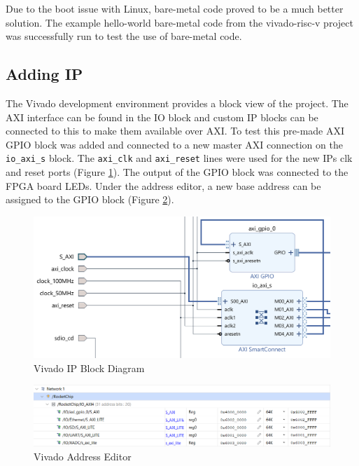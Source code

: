 Due to the boot issue with Linux, bare-metal code proved to be a much better solution. The example hello-world bare-metal code from the vivado-risc-v project was successfully run to test the use of bare-metal code.

\subsection{Adding IP}
The Vivado development environment provides a block view of the project. The AXI interface can be found in the IO block and custom IP blocks can be connected to this to make them available over AXI. To test this pre-made AXI GPIO block \cite{xilinx_gpio} was added and connected to a new master AXI connection on the \texttt{io\_axi\_s} block. The \texttt{axi\_clk} and \texttt{axi\_reset} lines were used for the new IPs clk and reset ports (Figure \ref{fig:gpio_ip}). The output of the GPIO block was connected to the FPGA board LEDs. Under the address editor, a new base address can be assigned to the GPIO block (Figure \ref{fig:address_editor}).

\begin{figure}[H]
	\centering
	\includegraphics[scale=0.4]{GPIO_IP.png}
	\caption{Vivado IP Block Diagram}
	\label{fig:gpio_ip}
\end{figure}

\begin{figure}[H]
	\centering
	\includegraphics[scale=0.6]{address_editor.png}
	\caption{Vivado Address Editor}
	\label{fig:address_editor}
\end{figure}

